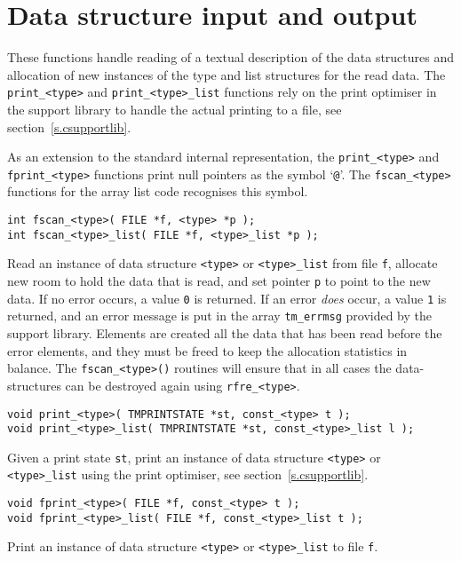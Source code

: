 \section{Data structure input and output}
These functions handle reading of a textual description of the data structures
and allocation of new instances of the type and list structures for the
read data.
The \texttt{print\_<type>} and \texttt{print\_<type>\_list} functions rely on the
print optimiser in the
{\C} support library to handle the actual printing to a file,
see section~\ref{s.csupportlib}.
\par
\begin{sloppypar}
As an extension to the standard {\Tm} internal representation,
the \verb!print_<type>! and \verb'fprint_<type>' functions print null
pointers as the symbol `\texttt{@}'.
The \verb+fscan_<type>+ functions for the array list code recognises
this symbol.
\end{sloppypar}
\begin{verbatim}
int fscan_<type>( FILE *f, <type> *p );
int fscan_<type>_list( FILE *f, <type>_list *p );
\end{verbatim}
\begin{desc}
Read an instance of data structure \texttt{<type>} or \texttt{<type>\_list}
from file \texttt{f},
allocate new room to hold the data that is read,
and set pointer \texttt{p} to point to the new data.
If no error occurs, a value \texttt{0} is returned.
If an error \emph{does} occur,
a value \texttt{1} is returned, and an error message is put in the array
\texttt{tm\_errmsg} provided by the {\C} support library.
Elements are created all the data that has been read before the error elements,
and they must be freed to keep the allocation statistics in balance.
The \verb+fscan_<type>()+ routines will ensure that in all cases the
data-structures can be destroyed again using \verb+rfre_<type>+.
\end{desc}
\begin{verbatim}
void print_<type>( TMPRINTSTATE *st, const_<type> t );
void print_<type>_list( TMPRINTSTATE *st, const_<type>_list l );
\end{verbatim}
\begin{desc}
Given a print state \texttt{st},
print an instance of data structure \texttt{<type>} or \texttt{<type>\_list}
using the print optimiser, see section~\ref{s.csupportlib}.
\end{desc}
\begin{verbatim}
void fprint_<type>( FILE *f, const_<type> t );
void fprint_<type>_list( FILE *f, const_<type>_list t );
\end{verbatim}
\begin{desc}
Print an instance of data structure \texttt{<type>} or \texttt{<type>\_list}
to file \texttt{f}.
\end{desc}
